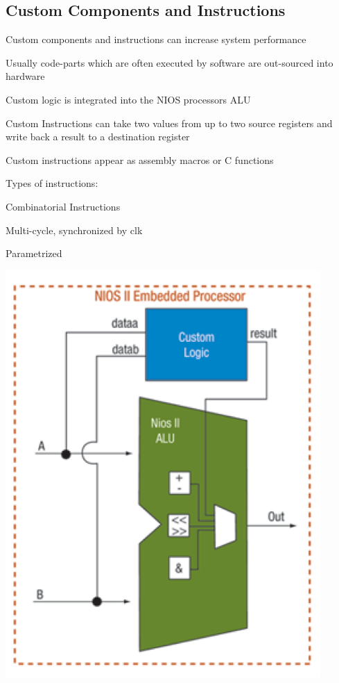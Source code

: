 	\subsection{Custom Components and Instructions } 
		\begin{minipage}[H]{0.8\textwidth}
			\begin{compactitem}
				\item Custom components and instructions can increase system performance
				\item Usually code-parts which are often executed by software are out-sourced into hardware
				\item Custom logic is integrated into the NIOS processors ALU
				\item Custom Instructions can take two values from up to two source registers and write back a result to a destination register
				\item Custom instructions appear as assembly macros or C functions
				\item Types of instructions:
					\begin{compactitem}
						\item Combinatorial Instructions
						\item Multi-cycle, synchronized by clk
						\item Parametrized
					\end{compactitem}
			\end{compactitem}
		\end{minipage}
		\begin{minipage}[H]{0.2\textwidth}
			\includegraphics[width=0.9\textwidth]{./pictures/custom_instruction.png} 
		\end{minipage}
	
